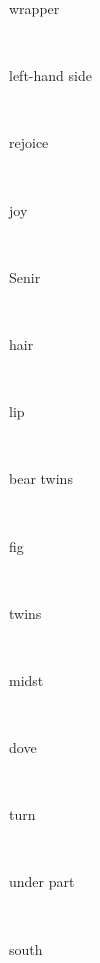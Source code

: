 \documentclass[a4paper]{article}
\begin{document}
\begin{multicols}{4}
\begin{multicols}{4}
\begin{multicols}{5}
{\hebrewfont{}} \begin{english}wrapper\end{english}\\
{\hebrewfont{}} \begin{english}left-hand side\end{english}\\
{\hebrewfont{}} \begin{english}rejoice\end{english}\\
{\hebrewfont{}} \begin{english}joy\end{english}\\
{\hebrewfont{}} \begin{english}Senir\end{english}\\
{\hebrewfont{}} \begin{english}hair\end{english}\\
{\hebrewfont{}} \begin{english}lip\end{english}\\
{\hebrewfont{}} \begin{english}bear twins\end{english}\\
{\hebrewfont{}} \begin{english}fig\end{english}\\
{\hebrewfont{}} \begin{english}twins\end{english}\\
{\hebrewfont{}} \begin{english}midst\end{english}\\
{\hebrewfont{}} \begin{english}dove\end{english}\\
{\hebrewfont{}} \begin{english}turn\end{english}\\
{\hebrewfont{}} \begin{english}under part\end{english}\\
{\hebrewfont{}} \begin{english}south\end{english}\\

\end{multicols}
\end{multicols}
\end{multicols}
\end{document}
